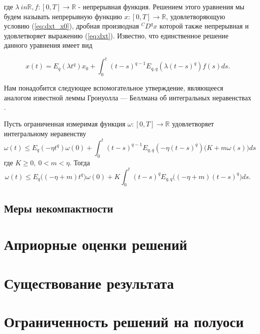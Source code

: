 \noindent где $\lambda \ in \mathbb{R}, f : [0, T] \rightarrow \mathbb{R}$ - непрерывная функция. Решением этого уравнения мы
будем называть непрерывную функцию $x : [0, T] \rightarrow \mathbb{R}$, удовлетворяющую условию (\ref{eq:dxt_x0}),
дробная производная ${}^{C}D^{q}x$ которой также непрерывная и удовлетворяет выражению (\ref{eq:dxt}). Известно, что единственное
решение данного уравнения имеет вид

\begin{equation}
    x(t) = E_{q}(\lambda t^{q})x_{0} + \int_{0}^{t} (t-s)^{q-1} E_{q,q}(\lambda(t-s)^{q})f(s)ds.
\end{equation}

Нам понадобится следующее вспомогательное утверждение, являющееся аналогом известной
леммы Гронуолла — Беллмана об интегральных неравенствах \cite{kamenskii_aa}.

\begin{lemma}
    Пусть ограниченная измеримая функция $\omega: [0, T] \rightarrow \mathbb{R}$ удовлетворяет интегральному неравенству
    \begin{equation}
        \omega(t) \leq E_{q} (-\eta t^{q}) \omega(0) + \int_{0}^{t}(t-s)^{q-1} E_{q,q}(-\eta(t-s)^{q})\Big(K + m\omega(s)\Big)ds
    \end{equation}
    где $K \geq 0, \ 0 < m < \eta$. Тогда
    \begin{equation*}
        \omega(t) \leq E_{q} \Big((-\eta+m)t^{q}\Big) \omega(0) + K \int_{0}^{t} (t-s)^{q} E_{q,q} \Big((-\eta+m)(t-s)^{q}\Big)ds.
    \end{equation*}
\end{lemma}

\subsection{Меры некомпактности}

\clearpage

\section{Априорные оценки решений}

\clearpage

\section{Существование результата}

\clearpage

\section{Ограниченность решений на полуоси}

\clearpage


\nocite{*}

\printbibliography{}
